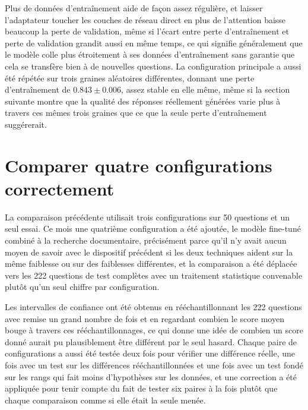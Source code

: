 \documentclass[11pt, a4paper]{article}
\begin{document}
Plus de donn\'ees d'entra\^inement aide de fa\c{c}on assez r\'eguli\`ere, et laisser l'adaptateur toucher les couches de r\'eseau direct en plus de l'attention baisse beaucoup la perte de validation, m\^eme si l'\'ecart entre perte d'entra\^inement et perte de validation grandit aussi en m\^eme temps, ce qui signifie g\'en\'eralement que le mod\`ele colle plus \'etroitement \`a ses donn\'ees d'entra\^inement sans garantie que cela se transf\`ere bien \`a de nouvelles questions. La configuration principale a aussi \'et\'e r\'ep\'et\'ee sur trois graines al\'eatoires diff\'erentes, donnant une perte d'entra\^inement de $0.843 \pm 0.006$, assez stable en elle m\^eme, m\^eme si la section suivante montre que la qualit\'e des r\'eponses r\'eellement g\'en\'er\'ees varie plus \`a travers ces m\^emes trois graines que ce que la seule perte d'entra\^inement sugg\'ererait.

\section{Comparer quatre configurations correctement}

La comparaison pr\'ec\'edente utilisait trois configurations sur 50 questions et un seul essai. Ce mois une quatri\`eme configuration a \'et\'e ajout\'ee, le mod\`ele fine-tun\'e combin\'e \`a la recherche documentaire, pr\'ecis\'ement parce qu'il n'y avait aucun moyen de savoir avec le dispositif pr\'ec\'edent si les deux techniques aident sur la m\^eme faiblesse ou sur des faiblesses diff\'erentes, et la comparaison a \'et\'e d\'eplac\'ee vers les 222 questions de test compl\`etes avec un traitement statistique convenable plut\^ot qu'un seul chiffre par configuration.

Les intervalles de confiance ont \'et\'e obtenus en r\'e\'echantillonnant les 222 questions avec remise un grand nombre de fois et en regardant combien le score moyen bouge \`a travers ces r\'e\'echantillonnages, ce qui donne une id\'ee de combien un score donn\'e aurait pu plausiblement \^etre diff\'erent par le seul hasard. Chaque paire de configurations a aussi \'et\'e test\'ee deux fois pour v\'erifier une diff\'erence r\'eelle, une fois avec un test sur les diff\'erences r\'e\'echantillonn\'ees et une fois avec un test fond\'e sur les rangs qui fait moins d'hypoth\`eses sur les donn\'ees, et une correction a \'et\'e appliqu\'ee pour tenir compte du fait de tester six paires \`a la fois plut\^ot que chaque comparaison comme si elle \'etait la seule men\'ee.
\end{document}
